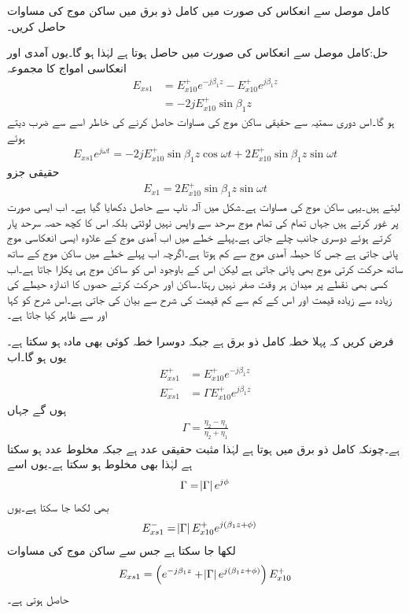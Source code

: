 کامل موصل سے انعکاس کی صورت میں کامل ذو برق میں ساکن موج کی مساوات حاصل کریں۔

حل:کامل موصل سے انعکاس کی صورت میں  حاصل ہوتا ہے  لہٰذا  ہو گا۔یوں آمدی اور انعکاسی امواج کا مجموعہ
\begin{align*}
E_{xs1}&=E_{x10}^+ e^{-j \beta_1 z} -E_{x10}^+ e^{j \beta_1 z}\\
&=-2 j E_{x10}^+ \sin \beta_1 z
\end{align*}
ہو گا۔اس دوری سمتیہ سے حقیقی ساکن موج کی مساوات حاصل کرنے کی خاطر اسے  سے ضرب دیتے ہوئے
\begin{align*}
E_{xs1} e^{j\omega t}=-2 j E_{x10}^+ \sin \beta_1 z \cos \omega t +2 E_{x10}^+ \sin \beta_1 z \sin \omega t
\end{align*}
 حقیقی جزو
\begin{align*}
E_{x1}=2 E_{x10}^+ \sin \beta_1 z \sin \omega t
\end{align*}
 لیتے ہیں۔یہی ساکن موج کی مساوات ہے۔شکل  میں آلہ ناپ سے حاصل  دکھایا گیا ہے۔
اب ایسی صورت پر غور کرتے ہیں جہاں تمام کی تمام موج سرحد سے واپس نہیں لوٹتی بلکہ اس کا کچھ حصہ سرحد پار کرتے ہوئے دوسری جانب چلے جاتی ہے۔پہلے خطے میں اب آمدی موج کے علاوہ ایسی انعکاسی موج پائی جاتی ہے جس کا حیطہ آمدی موج سے کم ہوتا ہے۔اگرچہ اب پہلے خطے میں ساکن موج کے ساتھ ساتھ حرکت  کرتی موج بھی پائی جاتی ہے لیکن اس کے باوجود اس کو ساکن موج ہی پکارا جاتا ہے۔اب کسی بھی نقطے پر میدان ہر وقت صفر نہیں رہتا۔ساکن اور حرکت کرتے حصوں کا اندازہ حیطے کی زیادہ سے زیادہ قیمت اور اس کے کم سے کم قیمت کی شرح سے بیان کی جاتی ہے۔اس شرح کو  کہا اور  سے ظاہر کیا جاتا ہے۔ 

فرض کریں کہ پہلا خطہ کامل ذو برق ہے جبکہ دوسرا خطہ کوئی بھی مادہ ہو سکتا ہے۔یوں  ہو گا۔اب
\begin{align*}
E_{xs1}^+&=E_{x10}^+ e^{-j\beta_1 z}\\
E_{xs1}^-&=\Gamma E_{x10}^+ e^{j\beta_1 z}
\end{align*}
ہوں گے جہاں
\begin{align*}
\Gamma=\frac{\eta_2-\eta_1}{\eta_2+\eta_1}
\end{align*}
ہے۔چونکہ کامل ذو برق میں  ہوتا ہے لہٰذا  مثبت حقیقی عدد ہے جبکہ  مخلوط عدد ہو سکتا ہے لہٰذا  بھی مخلوط ہو سکتا ہے۔یوں اسے
\begin{align*}
\Gamma=\abs{\Gamma}e^{j \phi}
\end{align*}
بھی لکھا جا سکتا ہے۔یوں
\begin{align*}
E_{xs1}^-&=\abs{\Gamma} E_{x10}^+ e^{j(\beta_1 z+\phi)}
\end{align*}
لکھا جا سکتا ہے جس سے ساکن موج کی مساوات
\begin{align}\label{مساوات_موج_ساکن_مخلوط_موج}
E_{xs1}=\left(e^{-j\beta_1 z}+\abs{\Gamma} e^{j(\beta_1z +\phi)} \right) E_{x10}^+
\end{align}
حاصل ہوتی ہے۔


